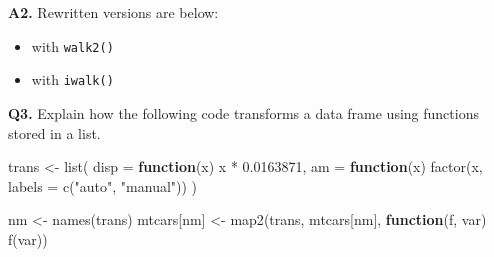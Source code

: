 \documentclass[
]{book}
\newenvironment{Shaded}{\begin{snugshade}}{\end{snugshade}}
\newcommand{\AttributeTok}[1]{\textcolor[rgb]{0.77,0.63,0.00}{#1}}
\newcommand{\ControlFlowTok}[1]{\textcolor[rgb]{0.13,0.29,0.53}{\textbf{#1}}}
\newcommand{\FloatTok}[1]{\textcolor[rgb]{0.00,0.00,0.81}{#1}}
\newcommand{\FunctionTok}[1]{\textcolor[rgb]{0.00,0.00,0.00}{#1}}
\newcommand{\NormalTok}[1]{#1}
\newcommand{\OtherTok}[1]{\textcolor[rgb]{0.56,0.35,0.01}{#1}}
\newcommand{\SpecialCharTok}[1]{\textcolor[rgb]{0.00,0.00,0.00}{#1}}
\newcommand{\StringTok}[1]{\textcolor[rgb]{0.31,0.60,0.02}{#1}}
\providecommand{\tightlist}{%
  \setlength{\itemsep}{0pt}\setlength{\parskip}{0pt}}
\begin{document}
\textbf{A2.} Rewritten versions are below:

\begin{itemize}
\tightlist
\item
  with \texttt{walk2()}
\end{itemize}

\begin{Shaded}
\end{Shaded}

\begin{itemize}
\tightlist
\item
  with \texttt{iwalk()}
\end{itemize}

\begin{Shaded}
\end{Shaded}

\textbf{Q3.} Explain how the following code transforms a data frame using functions stored in a list.

\begin{Shaded}
\begin{Highlighting}[]
\NormalTok{trans }\OtherTok{\textless{}{-}} \FunctionTok{list}\NormalTok{(}
  \AttributeTok{disp =} \ControlFlowTok{function}\NormalTok{(x) x }\SpecialCharTok{*} \FloatTok{0.0163871}\NormalTok{,}
  \AttributeTok{am =} \ControlFlowTok{function}\NormalTok{(x) }\FunctionTok{factor}\NormalTok{(x, }\AttributeTok{labels =} \FunctionTok{c}\NormalTok{(}\StringTok{"auto"}\NormalTok{, }\StringTok{"manual"}\NormalTok{))}
\NormalTok{)}

\NormalTok{nm }\OtherTok{\textless{}{-}} \FunctionTok{names}\NormalTok{(trans)}
\NormalTok{mtcars[nm] }\OtherTok{\textless{}{-}} \FunctionTok{map2}\NormalTok{(trans, mtcars[nm], }\ControlFlowTok{function}\NormalTok{(f, var) }\FunctionTok{f}\NormalTok{(var))}
\end{Highlighting}
\end{Shaded}
\end{document}
